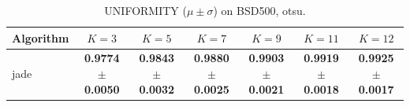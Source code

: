 \begin{table}[htbp]
\centering
\caption{UNIFORMITY ($\mu \pm \sigma$) on BSD500, otsu.}
\label{tab:exp1-otsu-uniformity}
\begin{tabular}{lcccccc}
\toprule
Algorithm & $K=3$ & $K=5$ & $K=7$ & $K=9$ & $K=11$ & $K=12$ \\
\midrule
jade & \textbf{0.9774 $\pm$ 0.0050} & \textbf{0.9843 $\pm$ 0.0032} & \textbf{0.9880 $\pm$ 0.0025} & \textbf{0.9903 $\pm$ 0.0021} & \textbf{0.9919 $\pm$ 0.0018} & \textbf{0.9925 $\pm$ 0.0017} \\
\bottomrule
\end{tabular}
\end{table}